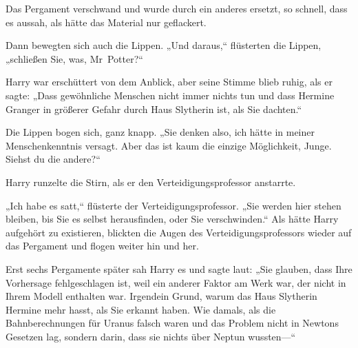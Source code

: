 Das Pergament verschwand und wurde durch ein anderes ersetzt, so schnell, dass es aussah, als hätte das Material nur geflackert.

Dann bewegten sich auch die Lippen. „Und daraus,“ flüsterten die Lippen, „schließen Sie, was, Mr~Potter?“

Harry war erschüttert von dem Anblick, aber seine Stimme blieb ruhig, als er sagte: „Dass gewöhnliche Menschen nicht immer nichts tun und dass Hermine Granger in größerer Gefahr durch Haus Slytherin ist, als Sie dachten.“

Die Lippen bogen sich, ganz knapp. „Sie denken also, ich hätte in meiner Menschenkenntnis versagt. Aber das ist kaum die einzige Möglichkeit, Junge. Siehst du die andere?“

Harry runzelte die Stirn, als er den Verteidigungsprofessor anstarrte.

„Ich habe es satt,“ flüsterte der Verteidigungsprofessor. „Sie werden hier stehen bleiben, bis Sie es selbst herausfinden, oder Sie verschwinden.“ Als hätte Harry aufgehört zu existieren, blickten die Augen des Verteidigungsprofessors wieder auf das Pergament und flogen weiter hin und her.

Erst sechs Pergamente später sah Harry es und sagte laut: „Sie glauben, dass Ihre Vorhersage fehlgeschlagen ist, weil ein anderer Faktor am Werk war, der nicht in Ihrem Modell enthalten war. Irgendein Grund, warum das Haus Slytherin Hermine mehr hasst, als Sie erkannt haben. Wie damals, als die Bahnberechnungen für Uranus falsch waren und das Problem nicht in Newtons Gesetzen lag, sondern darin, dass sie nichts über Neptun wussten—“

